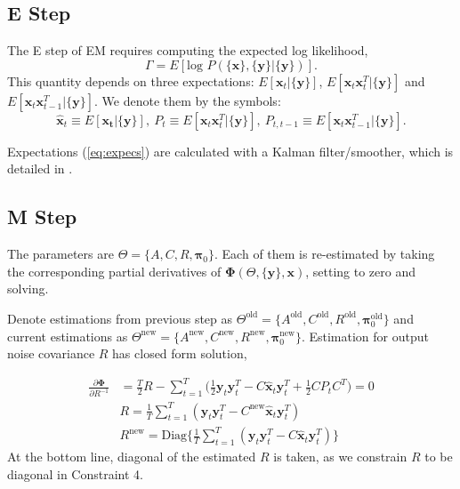 \documentclass[fleqn]{article}
\let\oldref\ref
\renewcommand{\ref}[1]{(\oldref{#1})}
\newcommand{\T}{T}
\begin{document}
\subsection{E Step}
The E step of EM requires computing the expected log likelihood,
\[
    \Gamma = E[\text{log }P(\{\mathbf{x}\},\{\mathbf{y}\}|\{\mathbf{y}\})].
\]
This quantity depends on three expectations: $E[\mathbf{x}_t|\{\mathbf{y}\}]$, $E[\mathbf{x}_t\mathbf{x}_t^{\T}|\{\mathbf{y}\}]$ and $E[\mathbf{x}_t\mathbf{x}_{t-1}^{\T}|\{\mathbf{y}\}]$. We denote them by the symbols:
\begin{equation}\label{eq:expecs}
\hat{\mathbf{x}}_t \equiv E[\mathbf{x_t}|\{\mathbf{y}\}],\  P_t  \equiv E[\mathbf{x}_t\mathbf{x}_t^{\T}|\{\mathbf{y}\}],\  P_{t,t-1}  \equiv E[\mathbf{x}_t\mathbf{x}_{t-1}^{\T}|\{\mathbf{y}\}].
\end{equation}

Expectations \ref{eq:expecs} are calculated with a Kalman filter/smoother, which is detailed in .
\subsection{M Step}
The parameters are $\Theta =\{A,C,R,\mathbf{\pi}_0\}$. Each of them is re-estimated by taking the corresponding partial derivatives of $\mathbf{\Phi}(\Theta,\{\mathbf{y}\},\mathbf{x})$, setting to zero and solving.

Denote estimations from previous step as $\Theta^{\text{old}} =\{A^{\text{old}},C^{\text{old}},R^{\text{old}},\mathbf{\pi}_0^{\text{old}}\}$ and current estimations as $\Theta^{\text{new}} =\{A^{\text{new}},C^{\text{new}},R^{\text{new}},\mathbf{\pi}_0^{\text{new}}\}$. Estimation for output noise covariance $R$ has closed form solution,

\begin{equation*}\label{eq:updateR}
\begin{aligned}
\frac{\partial \mathbf{\Phi}}{\partial R^{-1}} &= \frac{T}{2}R - \sum\limits_{t=1}^T\bigl(\frac{1}{2}\mathbf{y}_t\mathbf{y}_t^{\T} - C\hat{\mathbf{x}}_t\mathbf{y}_t^{\T}+\frac{1}{2}CP_tC^{\T}\bigr) =0 \\
& R = \frac{1}{T}\sum\limits_{t=1}^{T}(\mathbf{y}_t\mathbf{y}_t^{\T}-C^{\text{new}}\hat{\mathbf{x}}_t\mathbf{y}_t^{\T})\\
& R^{\text{new}} =\text{Diag}\biggl\{\frac{1}{T}\sum\limits_{t=1}^{T}(\mathbf{y}_t\mathbf{y}_t^{\T}-C\hat{\mathbf{x}}_t\mathbf{y}_t^{\T})\biggr\}
\end{aligned}
\end{equation*}
At the bottom line, diagonal of the estimated $R$ is taken, as we constrain $R$ to be diagonal in Constraint 4.
\end{document}
